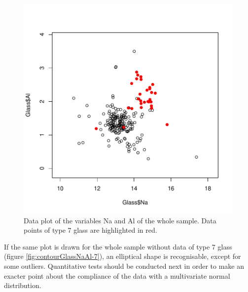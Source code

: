 \documentclass[a4paper, 12pt, titlepage, headsepline, listof = totoc, bibliography = totoc, numbers = noenddot]{scrartcl}
\begin{document}
\begin{figure}[h!]
\includegraphics[width=\textwidth]{report-cluster7}
\caption{Data plot of the variables Na and Al of the whole sample. Data points of type 7 glass are highlighted in red.}
\label{fig:cluster7}
\end{figure}

If the same plot is drawn for the whole sample without data of type 7 glass (figure \ref{fig:contourGlassNaAl-7}), an elliptical shape is recognisable, except for some outliers. Quantitative tests should be conducted next in order to make an exacter point about the compliance of the data with a multivariate normal distribution.
\end{document}
